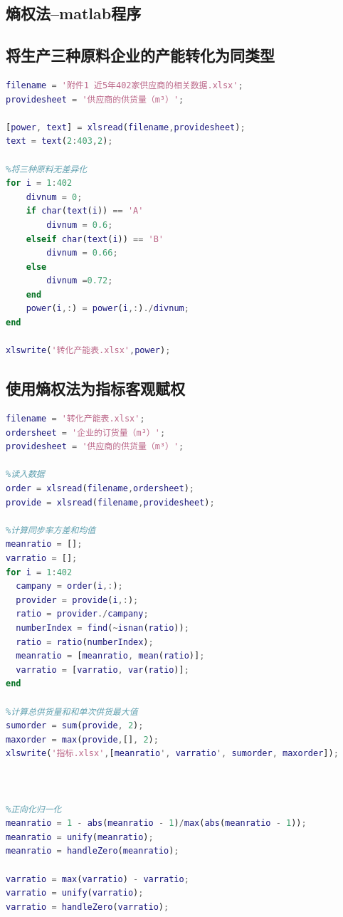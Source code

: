 \documentclass{cumcmthesis}
\begin{document}
\nocite{*}


\newpage
\begin{appendices}
    \section{熵权法--matlab程序}
    \subsection{将生产三种原料企业的产能转化为同类型}
    \begin{lstlisting}[language=matlab]
filename = '附件1 近5年402家供应商的相关数据.xlsx';
providesheet = '供应商的供货量（m³）';

[power, text] = xlsread(filename,providesheet);
text = text(2:403,2);

%将三种原料无差异化
for i = 1:402
    divnum = 0;
    if char(text(i)) == 'A'
        divnum = 0.6;
    elseif char(text(i)) == 'B'
        divnum = 0.66;
    else
        divnum =0.72;
    end
    power(i,:) = power(i,:)./divnum;
end

xlswrite('转化产能表.xlsx',power);
\end{lstlisting}
    \subsection{使用熵权法为指标客观赋权}
    \begin{lstlisting}[language=matlab]
filename = '转化产能表.xlsx';
ordersheet = '企业的订货量（m³）';
providesheet = '供应商的供货量（m³）';

%读入数据
order = xlsread(filename,ordersheet);
provide = xlsread(filename,providesheet);

%计算同步率方差和均值
meanratio = [];
varratio = [];
for i = 1:402
  campany = order(i,:);
  provider = provide(i,:);
  ratio = provider./campany;
  numberIndex = find(~isnan(ratio));
  ratio = ratio(numberIndex);
  meanratio = [meanratio, mean(ratio)];
  varratio = [varratio, var(ratio)];
end

%计算总供货量和和单次供货最大值
sumorder = sum(provide, 2);
maxorder = max(provide,[], 2);
xlswrite('指标.xlsx',[meanratio', varratio', sumorder, maxorder]);



%正向化归一化
meanratio = 1 - abs(meanratio - 1)/max(abs(meanratio - 1));
meanratio = unify(meanratio);
meanratio = handleZero(meanratio);

varratio = max(varratio) - varratio;
varratio = unify(varratio);
varratio = handleZero(varratio);


\end{lstlisting}
\end{appendices}
\end{document}
